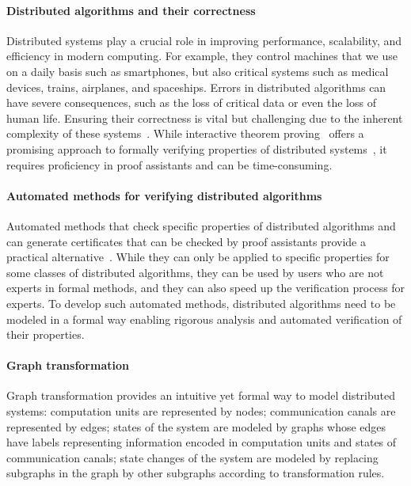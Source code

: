 
\paragraph{Distributed algorithms and their correctness}
Distributed systems play a crucial role in improving performance, 
scalability, and efficiency in modern computing.
For example, they control machines that we use on a daily basis such as smartphones, but also critical systems such as medical devices, trains, airplanes, and spaceships. Errors in distributed algorithms can have severe consequences, such as the loss of critical data or even the loss of human life. Ensuring their correctness is vital but challenging due to the inherent complexity of these systems~\cite{heiser2010theroad, lamport2019thebyzantine}. While interactive theorem proving~\cite{harrison2014history} offers a promising approach to formally verifying properties of distributed systems~\cite{plump2024formalisingDPO,potop2019formal,courtieu2016certified},  
it requires proficiency in proof assistants and can be
time-consuming.

\paragraph{Automated methods for verifying distributed algorithms}
 Automated methods that check specific properties of distributed algorithms and can generate certificates that can be checked by proof assistants provide a practical alternative~\cite{contejean2011automated,giesl2014proving}. While they can only be applied to specific properties for some classes of distributed algorithms, they can be used by users who are not experts in formal methods, and they can also speed up the verification process for experts. To develop such automated methods, distributed algorithms need to be modeled in a formal way enabling rigorous analysis and automated verification of their properties.


 \paragraph{Graph transformation}
 Graph transformation provides an intuitive yet formal way to model distributed systems: computation units are represented by nodes; communication canals are represented by edges; states of the system are modeled by graphs whose edges have labels representing information encoded in computation units and states of communication canals; state changes of the system are modeled by replacing subgraphs in the graph by other subgraphs according to transformation rules.

